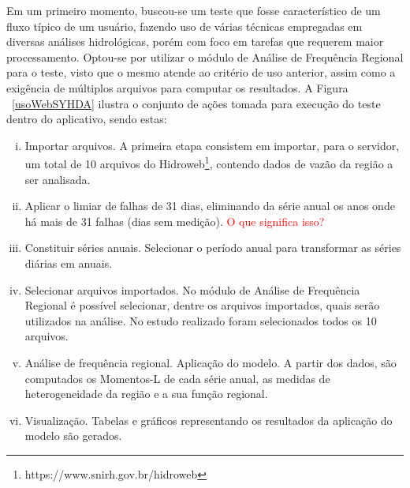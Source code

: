 \documentclass[12pt,english,brazil]{article}
\begin{document}
Em um primeiro momento, buscou-se um teste que fosse característico de um fluxo típico de um usuário, fazendo uso de várias técnicas empregadas em diversas análises hidrológicas, porém com foco em tarefas que requerem maior processamento. Optou-se por utilizar o módulo de Análise de Frequência Regional para o teste, visto que o mesmo atende ao critério de uso anterior, assim como a exigência de múltiplos arquivos para computar os resultados. A Figura ~\ref{usoWebSYHDA} ilustra o conjunto de ações tomada para execução do teste dentro do aplicativo, sendo estas:


\begin{enumerate}[i.]
  \item Importar arquivos. A primeira etapa consistem em importar, para o servidor, um total de 10 arquivos do Hidroweb\footnote{https://www.snirh.gov.br/hidroweb}, contendo dados de vazão da região a ser analisada.
  \item Aplicar o limiar de falhas de 31 dias, eliminando da série anual os anos onde há mais de 31 falhas (dias sem medição). \textcolor{red}{O que significa isso?}
  \item Constituir séries anuais. Selecionar o período anual para transformar as séries diárias em anuais.
  \item Selecionar arquivos importados. No módulo de Análise de Frequência Regional  é possível selecionar, dentre os arquivos importados, quais serão utilizados na análise. No estudo realizado foram selecionados todos os 10 arquivos.
  \item Análise de frequência regional. Aplicação do modelo. A partir dos dados, são computados os Momentos-L de cada série anual, as medidas de heterogeneidade da região e a sua função regional.
  \item Visualização. Tabelas e gráficos representando os resultados da aplicação do modelo são gerados.
\end{enumerate}
\end{document}
